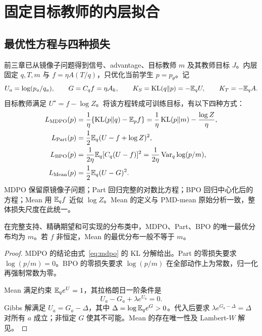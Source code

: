 \chapter{固定目标教师的内层拟合}
\label{ch:inner}
\section{最优性方程与四种损失}
前三章已从镜像子问题得到信号、advantage、目标教师 $m$ 及其教师目标 $J$。内层固定 $q,T,m$ 与 $f=\eta A(T/q)$，只优化当前学生 $p=p_\theta$。记
\begin{equation}
U_a=\log(p_a/q_a),\qquad G=C_qf=\eta\mathcal A_k,\qquad
K_S=\operatorname{KL}(q\Vert p)=-\mathbb E_qU,\qquad K_T=-\mathbb E_qA.
\end{equation}
目标教师满足 $U^\star=f-\log Z$。将该方程转成可训练目标，有以下四种方式：
\begin{align}
L_{\rm MDPO}(p)&=\frac1\eta\{\operatorname{KL}(p\Vert q)-\mathbb E_pf\}
=\frac1\eta\operatorname{KL}(p\Vert m)-\frac{\log Z}{\eta},\label{eq:mdpo}\\
L_{\rm Part}(p)&=\frac12\mathbb E_q(U-f+\log Z)^2,\label{eq:part}\\
L_{\rm BPO}(p)&=\frac1{2\eta}\mathbb E_q[C_q(U-f)]^2
=\frac1{2\eta}\operatorname{Var}_q\log(p/m),\label{eq:bpo}\\
L_{\rm Mean}(p)&=\frac12\mathbb E_q(U-G)^2.\label{eq:mean}
\end{align}
MDPO 保留原镜像子问题；Part 回归完整的对数比方程；BPO 回归中心化后的方程；Mean 用 $\mathbb E_qf$ 近似 $\log Z$。Mean 的定义与 PMD-mean 原始分析一致，整体损失尺度在此统一。

\begin{proposition}
\label{prop:inner-roots}
在完整支持、精确期望和可实现的分布类中，MDPO、Part、BPO 的唯一最优分布均为 $m$。若 $f$ 非恒定，Mean 的最优分布一般不等于 $m$。
\end{proposition}
\begin{proof}
MDPO 的结论由式~\eqref{eq:mdpo} 的 KL 分解给出。Part 的零损失要求 $\log(p/m)=0$。BPO 的零损失要求 $\log(p/m)$ 在全部动作上为常数，归一化再强制常数为零。

Mean 满足约束 $\mathbb E_qe^U=1$，其拉格朗日一阶条件是
\begin{equation}
U_a-G_a+\lambda e^{U_a}=0.
\label{eq:mean-kkt-main}
\end{equation}
Gibbs 解满足 $U_a=G_a-\Delta$，其中 $\Delta=\log\mathbb E_qe^G>0$。代入后要求 $\lambda e^{G_a-\Delta}=\Delta$ 对所有 $a$ 成立；非恒定 $G$ 使其不可能。Mean 的存在唯一性及 Lambert-$W$ 解见。
\end{proof}

